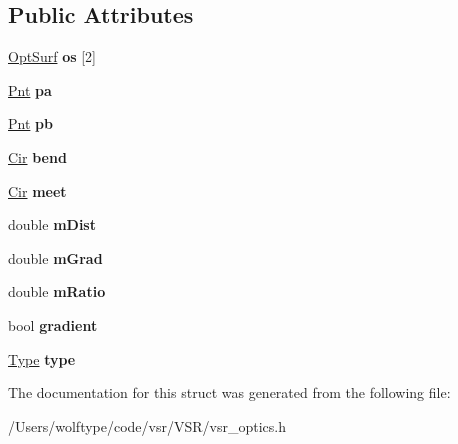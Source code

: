 \subsection*{Public Attributes}
\begin{DoxyCompactItemize}
\item 
\hypertarget{structvsr_1_1_lenz_a4508aeb6d92047c0d64ad5c19de5aebe}{\hyperlink{structvsr_1_1_opt_surf}{Opt\-Surf} {\bfseries os} \mbox{[}2\mbox{]}}\label{structvsr_1_1_lenz_a4508aeb6d92047c0d64ad5c19de5aebe}

\item 
\hypertarget{structvsr_1_1_lenz_a6dfc7df9363e4771ef93d8852f996f5e}{\hyperlink{namespacevsr_a2d05beb9721c5d9211b479af6d47222d}{Pnt} {\bfseries pa}}\label{structvsr_1_1_lenz_a6dfc7df9363e4771ef93d8852f996f5e}

\item 
\hypertarget{structvsr_1_1_lenz_aa20408656fa08830ffc8c418d0caca0f}{\hyperlink{namespacevsr_a2d05beb9721c5d9211b479af6d47222d}{Pnt} {\bfseries pb}}\label{structvsr_1_1_lenz_aa20408656fa08830ffc8c418d0caca0f}

\item 
\hypertarget{structvsr_1_1_lenz_ae8a28e45b0813ebb18de247d46f539a1}{\hyperlink{namespacevsr_a2744605aa828e495fc85463b7ae0d045}{Cir} {\bfseries bend}}\label{structvsr_1_1_lenz_ae8a28e45b0813ebb18de247d46f539a1}

\item 
\hypertarget{structvsr_1_1_lenz_a255cca8a1d19407ff9937a3f98e273a9}{\hyperlink{namespacevsr_a2744605aa828e495fc85463b7ae0d045}{Cir} {\bfseries meet}}\label{structvsr_1_1_lenz_a255cca8a1d19407ff9937a3f98e273a9}

\item 
\hypertarget{structvsr_1_1_lenz_a398b0492383190b1d241d81ce98a1cd9}{double {\bfseries m\-Dist}}\label{structvsr_1_1_lenz_a398b0492383190b1d241d81ce98a1cd9}

\item 
\hypertarget{structvsr_1_1_lenz_ac193ac85b8aae76be54ab1852e7d208b}{double {\bfseries m\-Grad}}\label{structvsr_1_1_lenz_ac193ac85b8aae76be54ab1852e7d208b}

\item 
\hypertarget{structvsr_1_1_lenz_a54caa21e5d47cb50fe5bac386618aea3}{double {\bfseries m\-Ratio}}\label{structvsr_1_1_lenz_a54caa21e5d47cb50fe5bac386618aea3}

\item 
\hypertarget{structvsr_1_1_lenz_a73af08cb9785f6ffae43dcccd6ba2f43}{bool {\bfseries gradient}}\label{structvsr_1_1_lenz_a73af08cb9785f6ffae43dcccd6ba2f43}

\item 
\hypertarget{structvsr_1_1_lenz_a3357c6bc12bf4fe5ed5d8bf2e69db146}{\hyperlink{structvsr_1_1_lenz_acf6ae241e35039b0dbda7b4f03ae095c}{Type} {\bfseries type}}\label{structvsr_1_1_lenz_a3357c6bc12bf4fe5ed5d8bf2e69db146}

\end{DoxyCompactItemize}


The documentation for this struct was generated from the following file\-:\begin{DoxyCompactItemize}
\item 
/\-Users/wolftype/code/vsr/\-V\-S\-R/vsr\-\_\-optics.\-h\end{DoxyCompactItemize}
